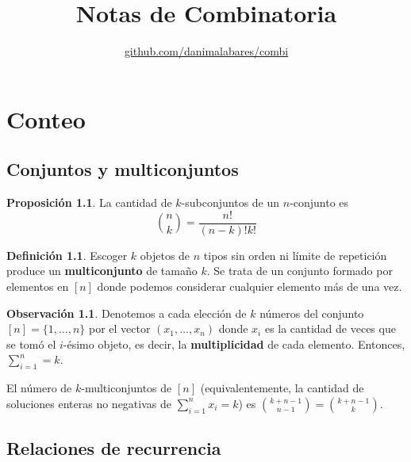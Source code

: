 \documentclass[spanish]{book}
\title{Notas de Combinatoria}
\author{
\href{https://github.com/danimalabares/combi}{github.com/danimalabares/combi}}
\renewcommand{\contentsname}{Índice}
\theoremstyle{definition}
\newtheorem*{defn}{Definición}
\newtheorem*{obs}{Observación}
\newtheorem*{prop}{Proposición}
\begin{document}
	\maketitle
	\addcontentsline{toc}{part}{\contentsname}
	\tableofcontents
	
\part{Conteo}
\chapter{Conjuntos y multiconjuntos}\label{chap:set-multiset}
	\begin{prop}
		La cantidad de $k$-subconjuntos de un $n$-conjunto es \[{n\choose k}=\frac{n!}{(n-k)!k!}\]
	\end{prop}
	\begin{defn}
		Escoger $k$ objetos de $n$ tipos sin orden ni límite de repetición produce un \textbf{multiconjunto} de tamaño $k$. Se trata de un conjunto formado por elementos en $[n]$ donde podemos considerar cualquier elemento más de una vez.
	\end{defn}
	\begin{obs}
		Denotemos a cada elección de $k$ números del conjunto $[n]=\{1,\ldots,n\}$ por el vector $(x_1,\ldots,x_n)$ donde $x_i$ es la cantidad de veces que se tomó el $i$-ésimo objeto, es decir, la \textbf{multiplicidad} de cada elemento. Entonces, $\sum_{i=1}^n=k$.
	\end{obs}
	\begin{teo}\label{thm:thm1}
		El número de $k$-multiconjuntos de $[n]$ (equivalentemente, la cantidad de soluciones enteras no negativas de $\sum_{i=1}^nx_i=k$) es ${k+n-1\choose n-1}={k+n-1\choose k}$.
	\end{teo}
\chapter{Relaciones de recurrencia}
\end{document}
